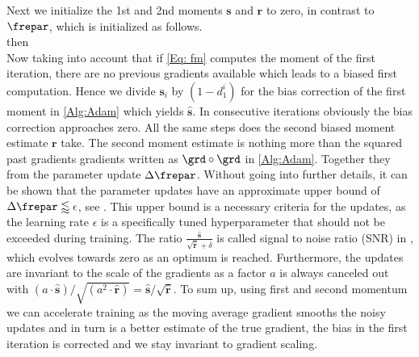 Next we initialize the 1st and 2nd moments \(\mathbf{s}\) and \(\mathbf{r}\) to zero, in contrast to \(\frepar\), which is initialized as follows.\\
then\\
Now taking into account that if \cref{Eq: fm} computes the moment of the first iteration, there are no previous gradients available which leads to a biased first computation. Hence we divide \(\mathbf{s}_i\) by \((1-d_1^i)\) for the bias correction of the first moment in \cref{Alg:Adam} which yields \(\hat{\mathbf{s}}\). In consecutive iterations obviously the bias correction approaches zero. All the same steps does the second biased moment estimate \(\mathbf{r}\) take. The second moment estimate is nothing more than the squared past gradients gradients written as \(\grd \circ\grd\) in \cref{Alg:Adam}. Together they from the parameter update \(\Delta\frepar\). Without going into further details, it can be shown that the parameter updates have an approximate upper bound of \(\Delta\frepar\lessapprox \epsilon\), see \cite{kingma2017adam}. This upper bound is a necessary criteria for the updates, as the learning rate \(\epsilon\) is a specifically tuned hyperparameter that should not be exceeded during training. The ratio \(\frac{\hat{\mathbf{s}}}{\sqrt{\hat{\mathbf{r}}}+\delta}\) is called signal to noise ratio (SNR) in \cite{kingma2017adam}, which evolves towards zero as an optimum is reached. Furthermore, the updates are invariant to the scale of the gradients as a factor \(a\) is always canceled out with \((a\cdot\hat{\mathbf{s}})/\sqrt{(a^2\cdot\hat{\mathbf{r}})}=\hat{\mathbf{s}}/\sqrt{\hat{\mathbf{r}}}\). To sum up, using first and second momentum we can accelerate training as the moving average gradient smooths the noisy updates and in turn is a better estimate of the true gradient, the bias in the first iteration is corrected and we stay invariant to gradient scaling.\\       
